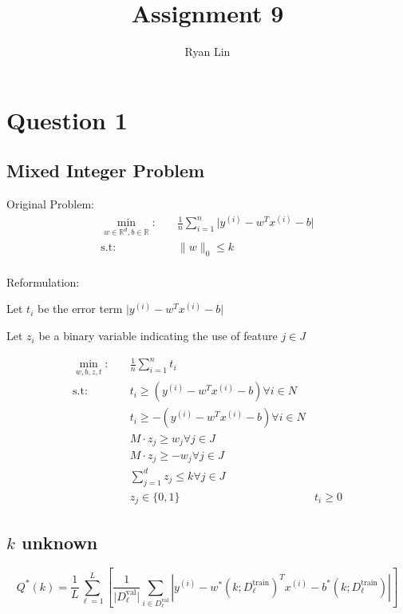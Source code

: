 \documentclass{report}
\title{Assignment 9}
\author{Ryan Lin}
\date{}
\begin{document}
\maketitle
\section{Question 1}
\subsection{Mixed Integer Problem}

Original Problem: 
\begin{align*}
	\min_{w \in \mathbb{R}^{d}, b \in \mathbb{R}}: \quad & \frac{1}{n} \sum_{i=1}^{n} \vert y^{(i)} - w^{T}x^{(i)} - b \vert \\
\text{s.t}: \quad & \lVert w \rVert_{0} \le k \\
\end{align*}

Reformulation:

Let $t_{i}$ be the error term $\vert y^{(i)} - w^{T}x^{(i)} - b \vert$ 

Let $z_{i}$ be a binary variable indicating the use of feature $j \in J$ 

\begin{align*}
\min_{w,b, z, t}: \quad & \frac{1}{n} \sum_{i=1}^{n} t_{i} \\
\text{s.t}: \quad &  t_{i} \ge  (y^{(i)}  - w^{T} x^{(i)} - b) \forall  i \in N \\
		  &t_{i} \ge - (y^{(i)}  - w^{T} x^{(i)} - b) \forall i \in N \\
		  & M \cdot z_j \ge w_{j} \forall j \in J \\
		  & M \cdot z_{j} \ge -w_{j} \forall j \in J\\
		  & \sum_{j=1}^{d} z_j \le k  \forall  j \in J\\
		  & z_j \in \{0,1\}
		  & t_{i} \ge 0 
\end{align*}

\newpage
\subsection{ $k$  unknown}

\[
	Q^{*}(k) = \frac{1}{L} \sum_{\ell=1}^{L} \left[ \frac{1}{\vert D_{\ell}^{\text{val}}\vert} \sum_{i \in D_{\ell}^{\text{val}}}^{} \left\vert y^{(i)} - w^{*}(k; D_{\ell}^{\text{train}})^{T}x^{(i)} - b^{*}(k; D_{\ell}^{\text{train}})\right\vert \right]
\]
\end{document}
